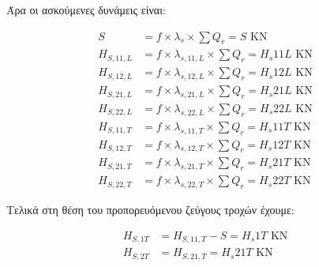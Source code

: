 Άρα οι ασκούμενες δυνάμεις είναι:

\begin{align*}
    S                &= f \times \lambda_s \times \sum{Q_r} = {{ S }} \text{ KN} \\
    H_{S,11,L}       &= f \times \lambda_{s,11,L} \times \sum{Q_r} = {{ H_s11L }} \text{ KN} \\
    H_{S,12,L}       &= f \times \lambda_{s,12,L} \times \sum{Q_r} = {{ H_s12L }} \text{ KN} \\
    H_{S,21,L}       &= f \times \lambda_{s,21,L} \times \sum{Q_r} = {{ H_s21L }} \text{ KN} \\
    H_{S,22,L}       &= f \times \lambda_{s,22,L} \times \sum{Q_r} = {{ H_s22L }} \text{ KN} \\
    H_{S,11,T}       &= f \times \lambda_{s,11,T} \times \sum{Q_r} = {{ H_s11T }} \text{ KN} \\
    H_{S,12,T}       &= f \times \lambda_{s,12,T} \times \sum{Q_r} = {{ H_s12T }} \text{ KN} \\
    H_{S,21,T}       &= f \times \lambda_{s,21,T} \times \sum{Q_r} = {{ H_s21T }} \text{ KN} \\
    H_{S,22,T}       &= f \times \lambda_{s,22,T} \times \sum{Q_r} = {{ H_s22T }} \text{ KN}
\end{align*}

Τελικά στη θέση του προπορευόμενου ζεύγους τροχών έχουμε:

\begin{align*}
    H_{S,1T} &= H_{S,11,T} - S = {{ H_s1T }} \text{ KN} \\
    H_{S,2T} &= H_{S,21,T} = {{ H_s21T }} \text{ KN}
\end{align*}
